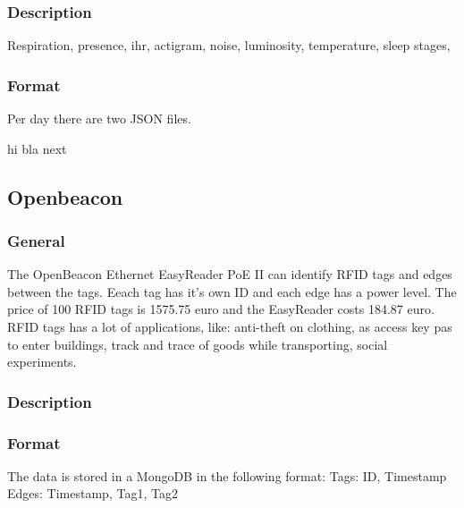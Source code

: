 			\subsubsection{Description}
				Respiration, presence, ihr, actigram, noise, luminosity, temperature, sleep stages, 
			\subsubsection{Format}
			Per day there are two JSON files.
			\begin{algorithm}
				\SetAlgoLined
				hi\;
				bla next
			\end{algorithm}
	\subsection{Openbeacon}
		\subsubsection{General}
			The OpenBeacon Ethernet EasyReader PoE II can identify RFID tags and edges between the tags. Eeach tag has it's own ID and each edge has a power level. The price of 100 RFID tags is 1575.75 euro and the EasyReader costs 184.87 euro. RFID tags has a lot of applications, like: anti-theft on clothing, as access key pas to enter buildings, track and trace of goods while transporting, social experiments.
		\subsubsection{Description}

		\subsubsection{Format}
		The data is stored in a MongoDB in the following format:
		Tags: ID, Timestamp
		Edges: Timestamp, Tag1, Tag2
